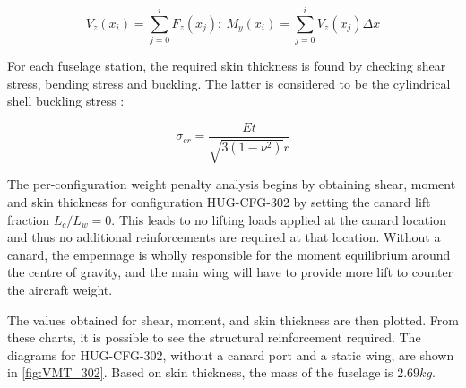\begin{equation}
    V_z(x_i) = \sum_{j=0}^{i} F_z(x_j);\ M_y(x_i) = \sum_{j=0}^{i} V_z(x_j)\Delta x
\end{equation}

For each fuselage station, the required skin thickness is found by checking shear stress, bending stress and buckling. The latter is considered to be the cylindrical shell buckling stress \cite{NASA_SP8007_1968}:

\begin{equation}
    \sigma_{cr}
    =
    \frac{E t}{\sqrt{3(1-\nu^2)}r}
\end{equation}






The per-configuration weight penalty analysis begins by obtaining shear, moment and skin thickness for configuration HUG-CFG-302 by setting the canard lift fraction $L_c / L_w = 0$. This leads to no lifting loads applied at the canard location and thus no additional reinforcements are required at that location. Without a canard, the empennage is wholly responsible for the moment equilibrium around the centre of gravity, and the main wing will have to provide more lift to counter the aircraft weight.

The values obtained for shear, moment, and skin thickness are then plotted. From these charts, it is possible to see the structural reinforcement required. The diagrams for HUG-CFG-302, without a canard port and a static wing, are shown in \autoref{fig:VMT_302}. Based on skin thickness, the mass of the fuselage is $2.69kg$.


